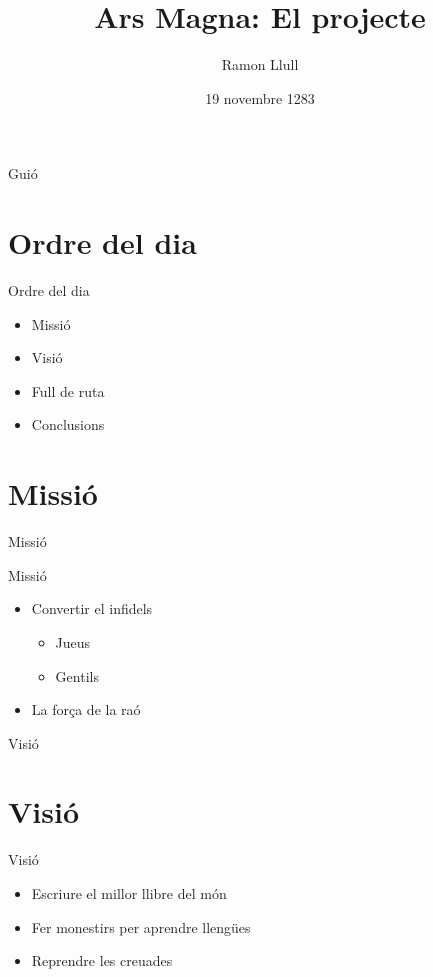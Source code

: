 \documentclass{beamer}
\title{Ars Magna: El projecte}
\author{Ramon Llull}
\institute{Cort del Rei en Jaume II}
\date{19 novembre 1283}
\begin{document}
\begin{frame}
  \titlepage
\end{frame}

\begin{frame}{Guió}
  \tableofcontents
\end{frame}

\section{Ordre del dia}

\begin{frame}{Ordre del dia}

\begin{itemize}
  \item Missió 
  \item Visió
  \item Full de ruta
  \item Conclusions
\end{itemize}

\end{frame}



\section{Missió}

\begin{frame}{Missió}

\begin{block}{Missió}
\begin{itemize}
\item Convertir el infidels
  \begin{itemize}
    \item Jueus
    \item Gentils
  \end{itemize}
\item La força de la raó
\end{itemize}
\end{block}

\end{frame}

\begin{frame}{Visió}

\section{Visió}
\begin{block}{Visió}
\begin{itemize}
\item Escriure el millor llibre del món
\item Fer monestirs per aprendre llengües 
\item Reprendre les creuades
\end{itemize}
\end{block}

\end{frame}
\end{document}
